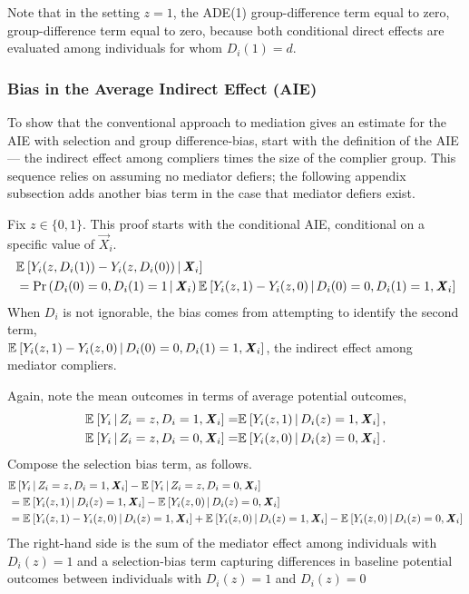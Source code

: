 Note that in the setting $z=1$, the ADE(1) group-difference term equal to zero, group-difference term equal to zero, because both conditional direct effects are evaluated among individuals for whom  $D_i(1)=d$.

\subsubsection{Bias in the Average Indirect Effect (AIE)}
To show that the conventional approach to mediation gives an estimate for the AIE with selection and group difference-bias, start with the definition of the AIE --- the indirect effect among compliers times the size of the complier group.
This sequence relies on assuming no mediator defiers; the following appendix subsection adds another bias term in the case that mediator defiers exist.

Fix $z \in \{0,1\}$.
This proof starts with the conditional AIE, conditional on a specific value of $\vec X_i$.
\begin{align*}
    &\mathbb{E}_{} \left[  Y_i(z, D_i(1)) - Y_i(z, D_i(0)) \, \middle\vert \, \boldsymbol{\mathit{X}}_i \right] \\
    &= \Pr\left( D_i(0)=0, D_i(1)=1 \, \middle\vert \, \boldsymbol{\mathit{X}}_i \right)
        \mathbb{E}_{} \left[  Y_i(z, 1) - Y_i(z, 0) \, \middle\vert \, D_i(0)=0, D_i(1)=1, \boldsymbol{\mathit{X}}_i \right]
\end{align*}
When $D_i$ is not ignorable, the bias comes from attempting to identify the second term,
\\ $\mathbb{E}_{} \left[  Y_i(z, 1) - Y_i(z, 0) \, \middle\vert \, D_i(0)=0, D_i(1)=1, \boldsymbol{\mathit{X}}_i \right]$, the indirect effect among mediator compliers.

Again, note the mean outcomes in terms of average potential outcomes,
\begin{align*}
    \mathbb{E}_{} \left[ Y_i \, \middle\vert \, Z_i = z, D_i = 1, \boldsymbol{\mathit{X}}_i \right]
    =& \mathbb{E}_{} \left[ Y_i(z, 1) \, \middle\vert \, D_i(z) = 1, \boldsymbol{\mathit{X}}_i \right], \\
    \mathbb{E}_{} \left[ Y_i \, \middle\vert \, Z_i = z, D_i = 0, \boldsymbol{\mathit{X}}_i \right]
    =& \mathbb{E}_{} \left[ Y_i(z, 0) \, \middle\vert \, D_i(z) = 0, \boldsymbol{\mathit{X}}_i \right].
\end{align*}
Compose the selection bias term, as follows.
\begin{align*}
    & \mathbb{E}_{} \left[ Y_i \, \middle\vert \, Z_i = z, D_i = 1, \boldsymbol{\mathit{X}}_i \right]
    - \mathbb{E}_{} \left[ Y_i \, \middle\vert \, Z_i = z, D_i = 0, \boldsymbol{\mathit{X}}_i \right] \\
    &= \mathbb{E}_{} \left[ Y_i(z, 1) \, \middle\vert \, D_i(z) = 1, \boldsymbol{\mathit{X}}_i \right]
        - \mathbb{E}_{} \left[ Y_i(z, 0) \, \middle\vert \, D_i(z) = 0, \boldsymbol{\mathit{X}}_i \right] \\
    &= \mathbb{E}_{} \left[ Y_i(z, 1) - Y_i(z, 0) \, \middle\vert \, D_i(z) = 1, \boldsymbol{\mathit{X}}_i \right]
        + \mathbb{E}_{} \left[ Y_i(z, 0) \, \middle\vert \, D_i(z) = 1, \boldsymbol{\mathit{X}}_i \right]
        - \mathbb{E}_{} \left[ Y_i(z, 0) \, \middle\vert \, D_i(z) = 0, \boldsymbol{\mathit{X}}_i \right]
\end{align*}
The right-hand side is the sum of the mediator effect among individuals with $D_i(z)=1$ and a selection-bias term capturing differences in baseline potential outcomes between individuals with $D_i(z)=1$ and $D_i(z)=0$

